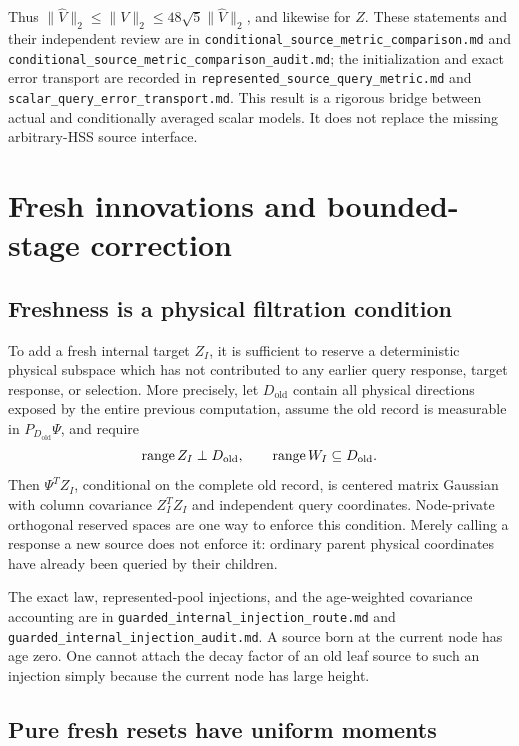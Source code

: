 \documentclass[11pt,oneside,openany,a4paper]{report}
\numberwithin{equation}{chapter}
\theoremstyle{definition}
\theoremstyle{remark}
\newcommand{\sourcefile}[1]{{\small\nolinkurl{#1}}}
\begin{document}
Thus
$\|\widehat V\|_2\leq\|V\|_2\leq48\sqrt5\|\widehat V\|_2$,
and likewise for $Z$.  These statements and their independent review
are in \sourcefile{conditional_source_metric_comparison.md} and
\sourcefile{conditional_source_metric_comparison_audit.md}; the
initialization and exact error transport are recorded in
\sourcefile{represented_source_query_metric.md} and
\sourcefile{scalar_query_error_transport.md}.  This result is a rigorous
bridge between actual and conditionally averaged scalar models.  It
does not replace the missing arbitrary-HSS source interface.

\chapter{Fresh innovations and bounded-stage correction}
\label{chap:route-fresh}

\section{Freshness is a physical filtration condition}

To add a fresh internal target $Z_I$, it is sufficient to reserve a
deterministic physical subspace which has not contributed to any
earlier query response, target response, or selection.  More precisely,
let $D_{\mathrm{old}}$ contain all physical directions exposed by the
entire previous computation, assume the old record is measurable in
$P_{D_{\mathrm{old}}}\Psi$, and require
\[
 \operatorname{range} Z_I\perp D_{\mathrm{old}},\qquad
 \operatorname{range} W_I\subseteq D_{\mathrm{old}}.
\]
Then $\Psi^TZ_I$, conditional on the complete old record, is centered
matrix Gaussian with column covariance $Z_I^TZ_I$ and independent
query coordinates.  Node-private orthogonal reserved spaces are one
way to enforce this condition.  Merely calling a response a new source
does not enforce it: ordinary parent physical coordinates have already
been queried by their children.

The exact law, represented-pool injections, and the age-weighted
covariance accounting are in
\sourcefile{guarded_internal_injection_route.md} and
\sourcefile{guarded_internal_injection_audit.md}.  A source born at the
current node has age zero.  One cannot attach the decay factor of an
old leaf source to such an injection simply because the current node
has large height.

\section{Pure fresh resets have uniform moments}
\end{document}

